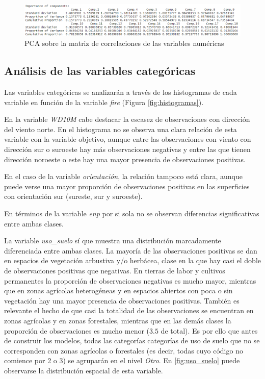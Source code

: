 \documentclass[12pt,a4paper,]{book}
\numberwithin{dummy}{section}
\theoremstyle{ocrenumbox}
\theoremstyle{blacknumex}
\theoremstyle{blacknumbox}
\theoremstyle{ocrenum}
\theoremstyle{ocrenum}
\begin{document}
\begin{figure}[h]
\centering
\includegraphics[width =\textwidth]{graficos/pca.png}
\caption{PCA sobre la matriz de correlaciones de las variables numéricas}
\label{fig:PCA}
\end{figure}

\hypertarget{anuxe1lisis-de-las-variables-categuxf3ricas}{%
\subsection{Análisis de las variables
categóricas}\label{anuxe1lisis-de-las-variables-categuxf3ricas}}

Las variables categóricas se analizarán a través de los histogramas de
cada variable en función de la variable \emph{fire} (Figura
\ref{fig:histogramas}).

En la variable \emph{WD10M} cabe destacar la escasez de observaciones
con dirección del viento norte. En el histograma no se observa una clara
relación de esta variable con la variable objetivo, aunque entre las
observaciones con viento con dirección sur o suroeste hay más
observaciones negativas y entre las que tienen dirección noroeste o este
hay una mayor presencia de observaciones positivas.

En el caso de la variable \emph{orientación}, la relación tampoco está
clara, aunque puede verse una mayor proporción de observaciones
positivas en las superficies con orientación sur (sureste, sur y
suroeste).

En términos de la variable \emph{enp} por si sola no se observan
diferencias significativas entre ambas clases.

La variable \emph{uso\_suelo} sí que muestra una distribución
marcadamente diferenciada entre ambas clases. La mayoría de las
observaciones positivas se dan en espacios de vegetación arbustiva y/o
herbácea, clase en la que hay casi el doble de observaciones positivas
que negativas. En tierras de labor y cultivos permanentes la proporción
de observaciones negativas es mucho mayor, mientras que en zonas
agrícolas heterogéneas y en espacios abiertos con poca o sin vegetación
hay una mayor presencia de observaciones positivas. También es relevante
el hecho de que casi la totalidad de las observaciones se encuentran en
zonas agrícolas y en zonas forestales, mientras que en las demás clases
la proporción de observaciones es mucho menor (\(3.5%
\) de total). Es por ello que antes de construir los modelos, todas las
categorías categorías de uso de suelo que no se corresponden con zonas
agrícolas o forestales (es decir, todas cuyo código no comience por 2 o
3) se agruparán en el nivel \emph{Otro}. En \ref{fig:uso_suelo} puede
observarse la distribución espacial de esta variable.
\end{document}
